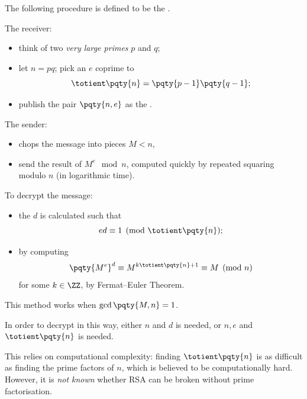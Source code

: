 \begin{definition}
    The following procedure is defined to be the .

    The receiver:
    \begin{itemize}
        \item think of two \emph{very large primes} \(p\) and \(q\);
        \item let \(n = pq\); pick an  \(e\) coprime to
        \[
            \totient \pqty{n} = \pqty{p - 1} \pqty{q - 1};
        \]
        \item publish the pair \(\pqty{n, e}\) as the .
    \end{itemize}

    The sender:
    \begin{itemize}
        \item chops the message into pieces \(M < n\),
        \item send the result of \(M^e \mod n\), computed quickly by repeated squaring modulo \(n\) (in logarithmic time).
    \end{itemize}

    To decrypt the message:
    \begin{itemize}
        \item the  \(d\) is calculated such that
        \[
            ed \equiv 1 \pmod{\totient\pqty{n}};
        \]
        \item by computing
        \[
            \pqty{M^e}^d \equiv M^{k \totient \pqty{n} + 1} \equiv M \pmod{n}
        \]
        for some \(k \in \ZZ\), by Fermat--Euler Theorem.
    \end{itemize}

    This method works when \(\gcd\pqty{M, n} = 1\).
\end{definition}

In order to decrypt in this way, either \(n\) and \(d\) is needed, or \(n, e\) and \(\totient\pqty{n}\) is needed.

This relies on computational complexity: finding \(\totient\pqty{n}\) is as difficult as finding the prime factors of \(n\), which is believed to be computationally hard. However, it is \emph{not known} whether RSA can be broken without prime factorisation.